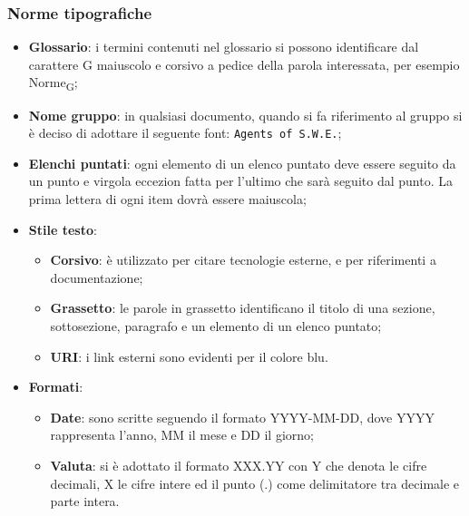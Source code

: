 \subsubsection{Norme tipografiche}
\begin{itemize}
	\item \textbf{Glossario}: i termini contenuti nel glossario si possono identificare dal carattere G maiuscolo e corsivo a pedice della parola interessata, per esempio Norme\textsubscript{G};	 		
	\item \textbf{Nome gruppo}: in qualsiasi documento, quando si fa riferimento al gruppo si è deciso di adottare il seguente font: \texttt{Agents of S.W.E.};
	\item \textbf{Elenchi puntati}: ogni elemento di un elenco puntato deve essere seguito da un punto e virgola eccezion fatta per l'ultimo che sarà seguito dal punto. La prima lettera di ogni item dovrà essere maiuscola;
	\item \textbf{Stile testo}:
	\begin{itemize}
		\item \textbf{Corsivo}: è utilizzato per citare tecnologie esterne, e per riferimenti a documentazione;	
		\item \textbf{Grassetto}: le parole in grassetto identificano il titolo di una sezione, sottosezione, paragrafo e un elemento di un elenco puntato;
		\item \textbf{URI}:	i link esterni sono evidenti per il colore blu.
	\end{itemize}
	\item \textbf{Formati}:
	\begin{itemize}
		\item \textbf{Date}: sono scritte seguendo il formato YYYY-MM-DD, dove YYYY rappresenta l'anno, MM il mese e DD il giorno;
		\item \textbf{Valuta}: si è adottato il formato XXX.YY con Y che denota le cifre decimali, X le cifre intere ed il punto (.) come delimitatore tra decimale e parte intera.
	\end{itemize}
\end{itemize}


